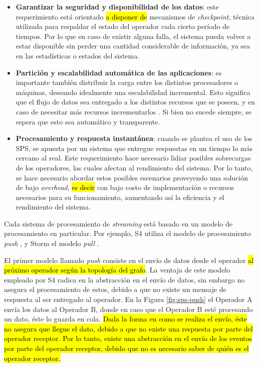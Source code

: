 \begin{itemize}
	\item \textbf{Garantizar la seguridad y disponibilidad de los datos}: este requerimiento está orientado \hl{a disponer de} mecanismos de \textit{checkpoint}, técnica utilizada para respaldar el estado del operador cada cierto período de tiempos. Por lo que en caso de existir alguna falla, el sistema pueda volver a estar disponible sin perder una cantidad considerable de información, ya sea en las estadísticas o estados del sistema.
	\item \textbf{Partición y escalabilidad automática de las aplicaciones}: es importante también distribuir la carga entre los distintos procesadores o máquinas, deseando idealmente una escalabilidad incremental. Esto significa que el flujo de datos sea entregado a los distintos recursos que se poseen, y en caso de necesitar más recursos incrementarlos \citep{bookTanenbaum}. Si bien no sucede siempre, se espera que esto sea automático y transparente.
	\item \textbf{Procesamiento y respuesta instantánea}: cuando se plantea el uso de los SPS, se apuesta por un sistema que entregue respuestas en un tiempo lo más cercano al real. Este requerimiento hace necesario lidiar posibles sobrecargas de los operadores, las cuales afectan al rendimiento del sistema. Por lo tanto, se hace necesario abordar estos posibles escenarios proveyendo una solución de bajo \textit{overhead}, \hl{es decir} con bajo costo de implementación o recursos necesarios para su funcionamiento, aumentando así la eficiencia y el rendimiento del sistema.
\end{itemize}

Cada sistema de procesamiento de \textsl{streaming} está basado en un modelo de procesamiento en particular. Por ejemplo, S4 utiliza el modelo de procesamiento \textsl{push} \citep{s4yahoo}, y Storm el modelo \textsl{pull} \citep{stormtwitter}.

El primer modelo llamado \textit{push} consiste en el envío de datos desde el operador \hl{al próximo operador según la topología del grafo}. La ventaja de este modelo empleado por S4 radica en la abstracción en el envío de datos, sin embargo no asegura el procesamiento de estos, debido a que no existe un mensaje de respuesta al ser entregado al operador. En la Figura \ref{fig:sps-push} el Operador A envía los datos al Operador B, donde en caso que el Operador B esté procesando un dato, éste lo guarda en cola. \hl{Dada la forma en como se realiza el envío, éste no asegura que llegue el dato, debido a que no existe una respuesta por parte del operador receptor. Por lo tanto, existe una abstracción en el envío de los eventos por parte del operador receptor, debido que no es necesario saber de quién es el operador receptor.}

